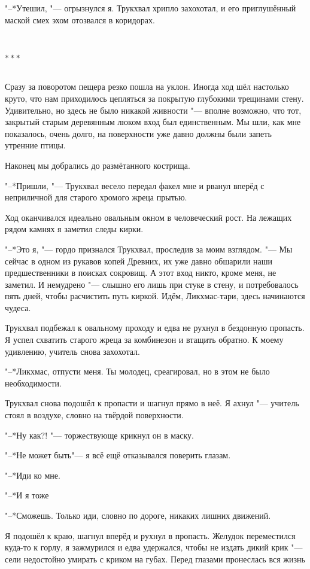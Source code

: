 \documentclass[a4paper,10pt]{book}
\newcommand{\ldotst}{\so{...}\xspace}
\newcommand{\ldotsq}{\so{?\hbox{\hspace{-.212em}}..}\xspace}
\newcommand{\razd}{~\\{\centering\Large\bfseries$\ast \ast \ast$\par}~\\}
\begin{document}
"--*Утешил, "--- огрызнулся я. Трукхвал хрипло захохотал, и его приглушённый 
маской смех эхом отозвался в коридорах.

\razd

Сразу за поворотом пещера резко пошла на уклон. Иногда ход шёл настолько круто, 
что нам приходилось цепляться за покрытую глубокими трещинами стену. 
Удивительно, но здесь не было никакой живности "--- вполне возможно, что тот, 
закрытый старым деревянным люком вход был единственным. Мы шли, как мне 
показалось, очень долго, на поверхности уже давно должны были запеть утренние 
птицы.

Наконец мы добрались до размётанного кострища.

"--*Пришли, "--- Трукхвал весело передал факел мне и рванул вперёд с 
неприличной для старого хромого жреца прытью.

Ход оканчивался идеально овальным окном в человеческий рост. На лежащих рядом 
камнях я заметил следы кирки.

"--*Это я, "--- гордо признался Трукхвал, проследив за моим взглядом. "--- Мы 
сейчас в одном из рукавов копей Древних, их уже давно обшарили наши 
предшественники в поисках сокровищ. А этот вход никто, кроме меня, не заметил. 
И немудрено "--- слышно его лишь при стуке в стену, и потребовалось пять дней, 
чтобы расчистить путь киркой. Идём, Ликхмас-тари, здесь начинаются чудеса.

Трукхвал подбежал к овальному проходу\ldotst и едва не рухнул в бездонную 
пропасть. Я успел схватить старого жреца за комбинезон и втащить обратно. К 
моему удивлению, учитель снова захохотал.

"--*Ликхмас, отпусти меня. Ты молодец, среагировал, но в этом не было 
необходимости.

Трукхвал снова подошёл к пропасти\ldotst и шагнул прямо в неё. Я ахнул "--- 
учитель стоял в воздухе, словно на твёрдой поверхности.

"--*Ну как?! "--- торжествующе крикнул он в маску.

"--*Не может быть\ldotst "--- я всё ещё отказывался поверить глазам.

"--*Иди ко мне.

"--*И я тоже\ldotsq

"--*Сможешь. Только иди, словно по дороге, никаких лишних движений.

Я подошёл к краю, шагнул вперёд\ldotst и рухнул в пропасть. Желудок 
переместился куда-то к горлу, я зажмурился и едва удержался, чтобы не издать 
дикий крик "--- сели недостойно умирать с криком на губах. Перед глазами 
пронеслась вся жизнь\ldotst
\end{document}
